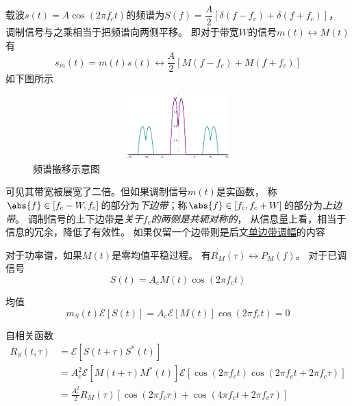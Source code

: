     载波$s(t)=A\cos(2\pi f_ct)$的频谱为$S(f)=\dfrac{A}{2}[\delta(f-f_c)+\delta(f+f_c)]$，
    调制信号与之乘相当于把频谱向两侧平移。
    即对于带宽$W$的信号$m(t)\leftrightarrow M(t)$有
    \begin{equation}
        s_m(t)=m(t)s(t)\leftrightarrow\frac{A}{2}[M(f-f_c)+M(f+f_c)]
    \end{equation}
    如下图所示
    \begin{figure}[H]
        \centering
        \includegraphics[width=400pt,height=70pt]{body/image/book423.pdf}
        \caption{频谱搬移示意图}
    \end{figure}

    可见其带宽被展宽了二倍。但如果调制信号$m(t)$是实函数，
    称$\abs{f}\in[f_c-W,f_c]$的部分为\emph{下边带}；称$\abs{f}\in[f_c,f_c+W]$的部分为\emph{上边带}。
    调制信号的上下边带是\emph{关于$f_c$的两侧是共轭对称的}，
    从信息量上看，相当于信息的冗余，降低了有效性。
    如果仅留一个边带则是后文\hyperref[subsubsec:SSB]{单边带调幅}的内容

    对于功率谱，如果$M(t)$是零均值平稳过程。
    有$R_M(\tau)\leftrightarrow P_M(f)$。
    对于已调信号
    \begin{equation}
        S(t)=A_cM(t)\cos(2\pi f_c t)
    \end{equation}

    均值
    \begin{equation}
        m_S(t)\mathscr{E}[S(t)]=A_c\mathscr{E}[M(t)]\cos(2\pi f_c t)=0
    \end{equation}

    自相关函数
    \begin{equation*}
        \begin{split}
            R_S(t,\tau)&=\mathscr{E}[S(t+\tau)S^*(t)]\\
                     &=A_c^2\mathscr{E}[M(t+\tau)M^*(t)]\mathscr{E}[\cos(2\pi f_c t)\cos(2\pi f_c t+2\pi f_c \tau)]\\
                     &=\frac{A_c^2}{2}R_M(\tau)[\cos(2\pi f_c \tau)+\cos(4\pi f_c t+2\pi f_c \tau)]
        \end{split}
    \end{equation*}

